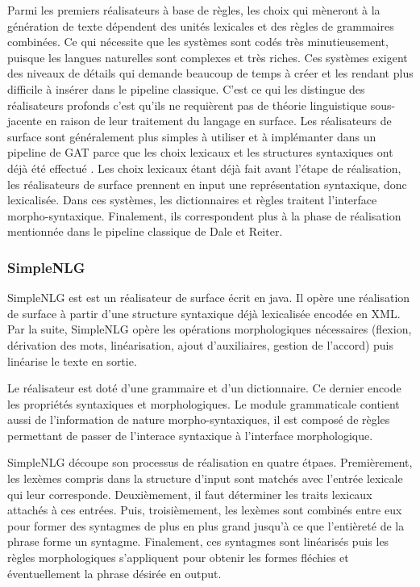 Parmi les premiers réalisateurs à base de règles, les choix qui mèneront à la génération de texte dépendent des unités lexicales et des règles de grammaires combinées. Ce qui nécessite que les systèmes sont codés très minutieusement, puisque les langues naturelles sont complexes et très riches. Ces systèmes exigent des niveaux de détails qui demande beaucoup de temps à créer et les rendant plus difficile à insérer dans le pipeline classique. C'est ce qui les distingue des réalisateurs profonds c'est qu'ils ne requièrent pas de théorie linguistique sous-jacente en raison de leur traitement du langage en surface. Les réalisateurs de surface sont généralement plus simples à utiliser et à implémanter dans un pipeline de \ac{GAT} \citep{gatt18} parce que les choix lexicaux et les structures syntaxiques ont déjà été effectué \citep{lareau18}. Les choix lexicaux étant déjà fait avant l'étape de réalisation, les réalisateurs de surface prennent en input une représentation syntaxique, donc lexicalisée. Dans ces systèmes, les dictionnaires et règles traitent l'interface morpho-syntaxique. Finalement, ils correspondent plus à la phase de réalisation mentionnée dans le pipeline classique de Dale et Reiter.

\subsubsection{SimpleNLG}
SimpleNLG est \citep{GattSimpleNLGRealisationEngine2009} est un réalisateur de surface écrit en java. Il opère une réalisation de surface à partir d'une structure syntaxique déjà lexicalisée encodée en XML. Par la suite, SimpleNLG opère les opérations morphologiques nécessaires (flexion, dérivation des mots, linéarisation, ajout d'auxiliaires, gestion de l'accord) puis linéarise le texte en sortie.

Le réalisateur est doté d'une grammaire et d'un dictionnaire. Ce dernier encode les propriétés syntaxiques et morphologiques. Le module grammaticale contient aussi de l'information de nature morpho-syntaxiques, il est composé de règles permettant de passer de l'interace syntaxique à l'interface morphologique.

SimpleNLG découpe son processus de réalisation en quatre étpaes. Premièrement, les lexèmes compris dans la structure d'input sont matchés avec l'entrée lexicale qui leur corresponde. Deuxièmement, il faut déterminer les traits lexicaux attachés à ces entrées. Puis, troisièmement, les lexèmes sont combinés entre eux pour former des syntagmes de plus en plus grand jusqu'à ce que l'entièreté de la phrase forme un syntagme. Finalement, ces syntagmes sont linéarisés puis les règles morphologiques s'appliquent pour obtenir les formes fléchies et éventuellement la phrase désirée en output.

